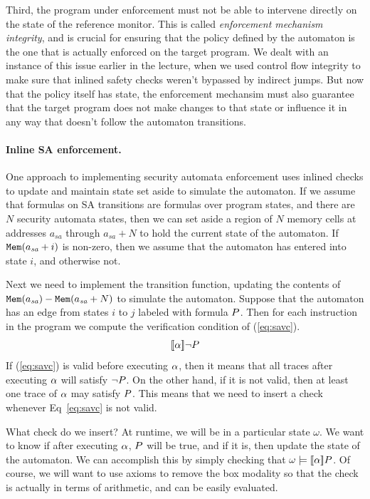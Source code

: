 \documentclass[11pt,twoside]{scrartcl}
\begin{document}
Third, the program under enforcement must not be able to intervene directly on the state of the reference monitor. This is called \emph{enforcement mechanism integrity}, and is crucial for ensuring that the policy defined by the automaton is the one that is actually enforced on the target program. We dealt with an instance of this issue earlier in the lecture, when we used control flow integrity to make sure that inlined safety checks weren't bypassed by indirect jumps. But now that the policy itself has state, the enforcement mechansim must also guarantee that the target program does not make changes to that state or influence it in any way that doesn't follow the automaton transitions.

\paragraph{Inline SA enforcement.} One approach to implementing security automata enforcement uses inlined checks to update and maintain state set aside to simulate the automaton. If we assume that formulas on SA transitions are formulas over program states, and there are $N$ security automata states, then we can set aside a region of $N$ memory cells at addresses $a_{\textit{sa}}$ through $a_{\textit{sa}}+N$ to hold the current state of the automaton. If $\texttt{\upshape Mem}(a_{\textit{sa}}+i)$ is non-zero, then we assume that the automaton has entered into state $i$, and otherwise not.

Next we need to implement the transition function, updating the contents of $\texttt{\upshape Mem}(a_{\textit{sa}}) - \texttt{\upshape Mem}(a_{\textit{sa}}+N)$ to simulate the automaton. Suppose that the automaton has an edge from states $i$ to $j$ labeled with formula $P$. Then for each instruction in the program we compute the verification condition of (\ref{eq:savc}).
\begin{equation}
\label{eq:savc}
\dbox{\asprg}{\lnot\ausfml}
\end{equation}
If (\ref{eq:savc}) is valid before executing $\alpha$, then it means that all traces after executing $\alpha$ will satisfy $\lnot P$. On the other hand, if it is not valid, then at least one trace of $\alpha$ may satisfy $P$. This means that we need to insert a check whenever Eq~\ref{eq:savc} is not valid.

What check do we insert? At runtime, we will be in a particular state $\omega$. We want to know if after executing $\alpha$, $P$ will be true, and if it is, then update the state of the automaton. We can accomplish this by simply checking that $\omega \models \dbox{\asprg}{\ausfml}$. Of course, we will want to use axioms to remove the box modality so that the check is actually in terms of arithmetic, and can be easily evaluated.
\end{document}
